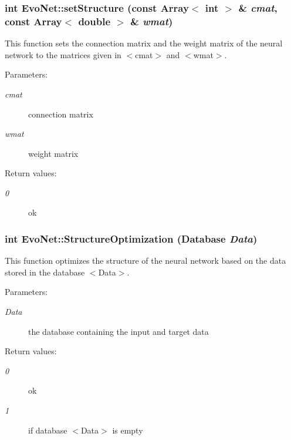 \subsubsection{\setlength{\rightskip}{0pt plus 5cm}int Evo\-Net::set\-Structure (const Array$<$ int $>$ \& {\em cmat}, const Array$<$ double $>$ \& {\em wmat})}\label{classEvoNet_a5}


This function sets the connection matrix and the weight matrix of the neural network to the matrices given in $<$cmat$>$ and $<$wmat$>$.

\begin{Desc}
\item[Parameters: ]\par
\begin{description}
\item[{\em 
cmat}]connection matrix \item[{\em 
wmat}]weight matrix \end{description}
\end{Desc}
\begin{Desc}
\item[Return values: ]\par
\begin{description}
\item[{\em 
0}]ok \end{description}
\end{Desc}
\subsubsection{\setlength{\rightskip}{0pt plus 5cm}int Evo\-Net::Structure\-Optimization (Database {\em Data})}\label{classEvoNet_a6}


This function optimizes the structure of the neural network based on the data stored in the database $<$Data$>$.

\begin{Desc}
\item[Parameters: ]\par
\begin{description}
\item[{\em 
Data}]the database containing the input and target data \end{description}
\end{Desc}
\begin{Desc}
\item[Return values: ]\par
\begin{description}
\item[{\em 
0}]ok \item[{\em 
1}]if database $<$Data$>$ is empty \end{description}
\end{Desc}
